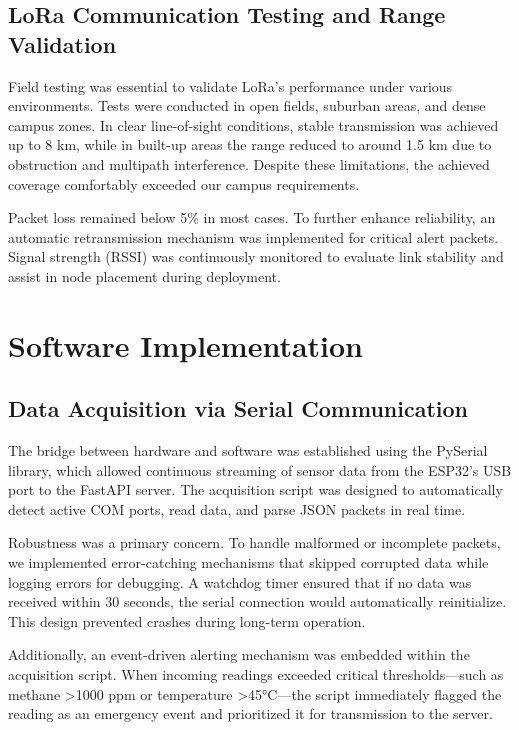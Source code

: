 \subsection{LoRa Communication Testing and Range Validation}
\label{subsec:lora_testing}

Field testing was essential to validate LoRa’s performance under various environments. Tests were conducted in open fields, suburban areas, and dense campus zones. In clear line-of-sight conditions, stable transmission was achieved up to 8 km, while in built-up areas the range reduced to around 1.5 km due to obstruction and multipath interference. Despite these limitations, the achieved coverage comfortably exceeded our campus requirements.

Packet loss remained below 5\% in most cases. To further enhance reliability, an automatic retransmission mechanism was implemented for critical alert packets. Signal strength (RSSI) was continuously monitored to evaluate link stability and assist in node placement during deployment.

\section{Software Implementation}
\label{sec:software_impl}

\subsection{Data Acquisition via Serial Communication}
\label{subsec:serial_comm}

The bridge between hardware and software was established using the PySerial library, which allowed continuous streaming of sensor data from the ESP32’s USB port to the FastAPI server. The acquisition script was designed to automatically detect active COM ports, read data, and parse JSON packets in real time.

Robustness was a primary concern. To handle malformed or incomplete packets, we implemented error-catching mechanisms that skipped corrupted data while logging errors for debugging. A watchdog timer ensured that if no data was received within 30 seconds, the serial connection would automatically reinitialize. This design prevented crashes during long-term operation.

Additionally, an event-driven alerting mechanism was embedded within the acquisition script. When incoming readings exceeded critical thresholds—such as methane >1000 ppm or temperature >45°C—the script immediately flagged the reading as an emergency event and prioritized it for transmission to the server.

